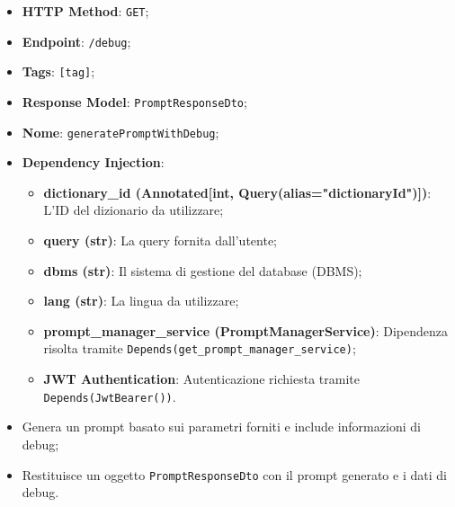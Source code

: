 \begin{itemize}
\item \textbf{HTTP Method}: \texttt{GET};
\item \textbf{Endpoint}: \texttt{/debug};
\item \textbf{Tags}: \texttt{[tag]};
\item \textbf{Response Model}: \texttt{PromptResponseDto};
\item \textbf{Nome}: \texttt{generatePromptWithDebug};
\item \textbf{Dependency Injection}:
\begin{itemize}
\item \textbf{dictionary\_id (Annotated[int, Query(alias="dictionaryId")])}: L'ID del dizionario da utilizzare;
\item \textbf{query (str)}: La query fornita dall'utente;
\item \textbf{dbms (str)}: Il sistema di gestione del database (DBMS);
\item \textbf{lang (str)}: La lingua da utilizzare;
\item \textbf{prompt\_manager\_service (PromptManagerService)}: Dipendenza risolta tramite \texttt{Depends(get\_prompt\_manager\_service)};
\item \textbf{JWT Authentication}: Autenticazione richiesta tramite \texttt{Depends(JwtBearer())}.
\end{itemize}
\end{itemize}

\begin{itemize}
\item Genera un prompt basato sui parametri forniti e include informazioni di debug;
\item Restituisce un oggetto \texttt{PromptResponseDto} con il prompt generato e i dati di debug.
\end{itemize}




